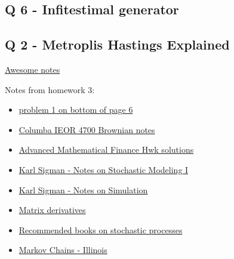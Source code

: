 \subsection{Q 6 - Infitestimal generator}

\subsection{Q 2 - Metroplis Hastings Explained}
\href{http://people.duke.edu/~kh269/teaching/notes/MetropolisExplanation.pdf}{Awesome notes}

Notes from homework 3:
\begin{itemize}
  \item \href{http://web.math.ku.dk/noter/filer/vidsand12.pdf}{problem 1 on  bottom of page 6}
	\item \href{http://www.columbia.edu/~ks20/FE-Notes/4700-07-Notes-BM.pdf}{Columba IEOR 4700 Brownian notes}
	\item \href{https://www.math.unl.edu/~sdunbar1/MathematicalFinance/Homework/2005Fall/489f05h6_soln.pdf}{Advanced Mathematical Finance Hwk solutions}
	\item \href{http://www.columbia.edu/~ks20/stochastic-I/stochastic-I.html}{Karl Sigman - Notes on Stochastic Modeling I}
	\item \href{http://www.columbia.edu/~ks20/4404-Sigman/Simulation-Sigman.html}{Karl Sigman - Notes on Simulation}
	\item \href{https://ccrma.stanford.edu/~dattorro/matrixcalc.pdf}{Matrix derivatives }
	\item \href{https://math.stackexchange.com/questions/1710343/where-to-start-stochastic-processes}{Recommended books on stochastic processes}
	\item \href{https://faculty.math.illinois.edu/~rsong/488f02/ch8.pdf}{Markov Chains - Illinois}
\end{itemize}



